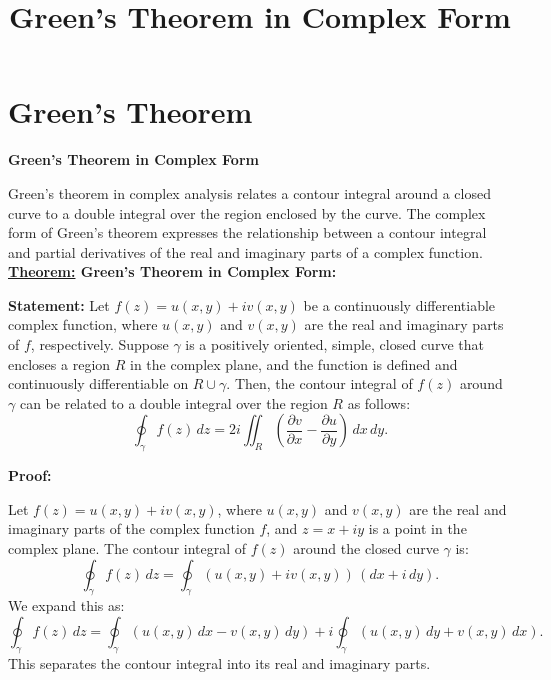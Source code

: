 \documentclass[12pt,a4paper]{article}
\begin{document}
	\tableofcontents
	\thispagestyle{empty}
	
	\section{Green's Theorem}
	
	\title{Green's Theorem in Complex Form} \textbf{Green's Theorem in Complex Form}
	
	Green's theorem in complex analysis relates a contour integral around a closed curve to a double integral over the region enclosed by the curve. The complex form of Green's theorem expresses the relationship between a contour integral and partial derivatives of the real and imaginary parts of a complex function. \\
	
	 \textbf{\underline{Theorem:} Green's Theorem in Complex Form:}
	
	\textbf{Statement:}	Let \( f(z) = u(x, y) + iv(x, y) \) be a continuously differentiable complex function, where \( u(x, y) \) and \( v(x, y) \) are the real and imaginary parts of \( f \), respectively. Suppose \( \gamma \) is a positively oriented, simple, closed curve that encloses a region \( R \) in the complex plane, and the function is defined and continuously differentiable on \( R \cup \gamma \). Then, the contour integral of \( f(z) \) around \( \gamma \) can be related to a double integral over the region \( R \) as follows:
	\[
	\oint_{\gamma} f(z) \, dz = 2i \iint_R \left( \frac{\partial v}{\partial x} - \frac{\partial u}{\partial y} \right) \, dx \, dy.
	\]
	
 \textbf{Proof:}
	
	 
	
	Let \( f(z) = u(x, y) + iv(x, y) \), where \( u(x, y) \) and \( v(x, y) \) are the real and imaginary parts of the complex function \( f \), and \( z = x + iy \) is a point in the complex plane. The contour integral of \( f(z) \) around the closed curve \( \gamma \) is:
	\[
	\oint_{\gamma} f(z) \, dz = \oint_{\gamma} (u(x, y) + iv(x, y)) \, (dx + i \, dy).
	\]
	We expand this as:
	\[
	\oint_{\gamma} f(z) \, dz = \oint_{\gamma} \left( u(x, y) \, dx - v(x, y) \, dy \right) + i \oint_{\gamma} \left( u(x, y) \, dy + v(x, y) \, dx \right).
	\]
	This separates the contour integral into its real and imaginary parts.
	
\end{document}
